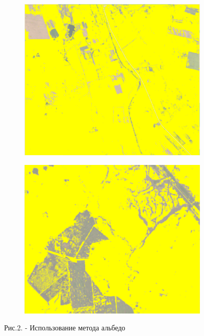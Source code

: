 \begin{figure}[H]
   \centering
   \begin{subfigure}{0.45\textwidth}
   	\centering
   	\includegraphics[width=\textwidth,height=0.8\textwidth]{media/ict/image33}
   \end{subfigure}
   \begin{subfigure}{0.45\textwidth}
   	\centering
   	\includegraphics[width=\textwidth,height=0.8\textwidth]{media/ict/image34}
   \end{subfigure}
   \caption*{Рис.2. - Использование метода альбедо}
\end{figure}

